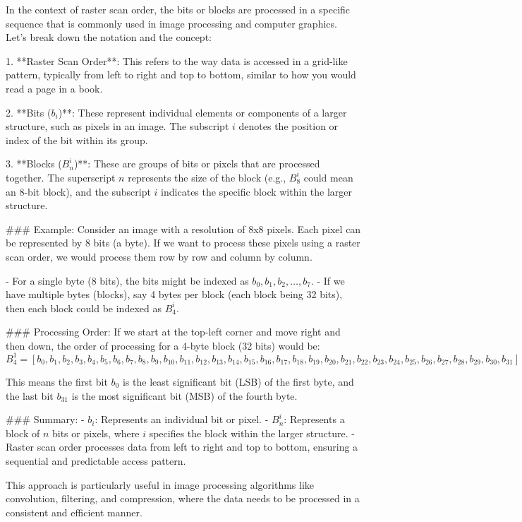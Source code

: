 In the context of raster scan order, the bits or blocks are processed in a specific sequence that is commonly used in image processing and computer graphics. Let's break down the notation and the concept:

1. **Raster Scan Order**: This refers to the way data is accessed in a grid-like pattern, typically from left to right and top to bottom, similar to how you would read a page in a book.

2. **Bits ($b_i$)**: These represent individual elements or components of a larger structure, such as pixels in an image. The subscript \( i \) denotes the position or index of the bit within its group.

3. **Blocks ($B_n^i$)**: These are groups of bits or pixels that are processed together. The superscript \( n \) represents the size of the block (e.g., \( B_8^i \) could mean an 8-bit block), and the subscript \( i \) indicates the specific block within the larger structure.

### Example:
Consider an image with a resolution of 8x8 pixels. Each pixel can be represented by 8 bits (a byte). If we want to process these pixels using a raster scan order, we would process them row by row and column by column.

- For a single byte (8 bits), the bits might be indexed as \( b_0, b_1, b_2, \ldots, b_7 \).
- If we have multiple bytes (blocks), say 4 bytes per block (each block being 32 bits), then each block could be indexed as \( B_4^i \).

### Processing Order:
If we start at the top-left corner and move right and then down, the order of processing for a 4-byte block (32 bits) would be:
\[ B_4^1 = [b_0, b_1, b_2, b_3, b_4, b_5, b_6, b_7, b_8, b_9, b_{10}, b_{11}, b_{12}, b_{13}, b_{14}, b_{15}, b_{16}, b_{17}, b_{18}, b_{19}, b_{20}, b_{21}, b_{22}, b_{23}, b_{24}, b_{25}, b_{26}, b_{27}, b_{28}, b_{29}, b_{30}, b_{31}] \]

This means the first bit \( b_0 \) is the least significant bit (LSB) of the first byte, and the last bit \( b_{31} \) is the most significant bit (MSB) of the fourth byte.

### Summary:
- \( b_i \): Represents an individual bit or pixel.
- \( B_n^i \): Represents a block of \( n \) bits or pixels, where \( i \) specifies the block within the larger structure.
- Raster scan order processes data from left to right and top to bottom, ensuring a sequential and predictable access pattern.

This approach is particularly useful in image processing algorithms like convolution, filtering, and compression, where the data needs to be processed in a consistent and efficient manner.